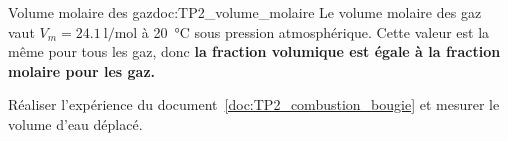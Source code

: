\begin{doc}{Volume molaire des gaz}{doc:TP2_volume_molaire}
  Le volume molaire des gaz vaut $V_m = \qty{24,1}{\litre\per\mole}$ à \qty{20}{\degreeCelsius} sous pression atmosphérique.
  Cette valeur est la même pour tous les gaz, donc \textbf{la fraction volumique est égale à la fraction molaire pour les gaz.}
\end{doc}

\mesure Réaliser l'expérience du document~\ref{doc:TP2_combustion_bougie} et mesurer le volume d'eau déplacé.



